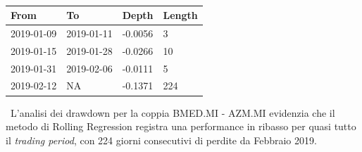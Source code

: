 \documentclass[]{article}
\begin{document}
\
\\
\begin{center}
	\begin{tabular}{@{}llll@{}}
	\toprule
	From       & To         & Depth   & Length \\ \midrule
	2019-01-09 & 2019-01-11 & -0.0056 & 3      \\
	2019-01-15 & 2019-01-28 & -0.0266 & 10     \\
	2019-01-31 & 2019-02-06 & -0.0111 & 5      \\
	\rowcolor[HTML]{FFCCC9} 
	2019-02-12 & NA         & -0.1371 & 224    \\ \bottomrule
	\end{tabular}
	\label{drawdowns_bmed_azm_rl}
\end{center}
\
L'analisi dei drawdown per la coppia BMED.MI - AZM.MI evidenzia che il metodo di Rolling Regression registra una performance in ribasso per quasi tutto il \textit{trading period}, con 224 giorni consecutivi di perdite da Febbraio 2019.
\end{document}
